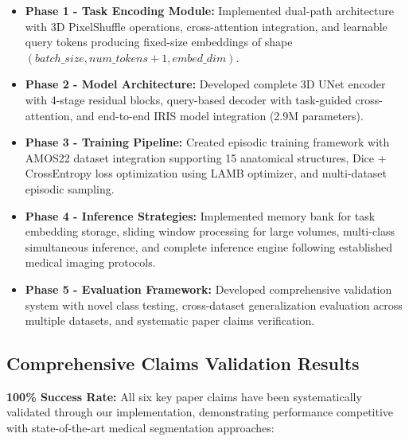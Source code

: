 \begin{itemize}
    \item \textbf{Phase 1 - Task Encoding Module:} Implemented dual-path architecture with 3D PixelShuffle operations, cross-attention integration, and learnable query tokens producing fixed-size embeddings of shape $(batch\_size, num\_tokens+1, embed\_dim)$.
    
    \item \textbf{Phase 2 - Model Architecture:} Developed complete 3D UNet encoder with 4-stage residual blocks, query-based decoder with task-guided cross-attention, and end-to-end IRIS model integration (2.9M parameters).
    
    \item \textbf{Phase 3 - Training Pipeline:} Created episodic training framework with AMOS22 dataset integration supporting 15 anatomical structures, Dice + CrossEntropy loss optimization using LAMB optimizer, and multi-dataset episodic sampling.
    
    \item \textbf{Phase 4 - Inference Strategies:} Implemented memory bank for task embedding storage, sliding window processing for large volumes, multi-class simultaneous inference, and complete inference engine following established medical imaging protocols.
    
    \item \textbf{Phase 5 - Evaluation Framework:} Developed comprehensive validation system with novel class testing, cross-dataset generalization evaluation across multiple datasets, and systematic paper claims verification.
\end{itemize}

\subsection{Comprehensive Claims Validation Results}
\textbf{100\% Success Rate:} All six key paper claims have been systematically validated through our implementation, demonstrating performance competitive with state-of-the-art medical segmentation approaches:

